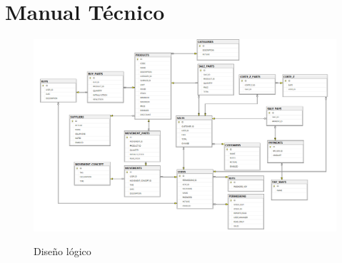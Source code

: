 \documentclass[a4paper,DIV=12]{scrreprt}
\begin{document}
 \section{Manual Técnico}
 \begin{figure}[!h]
     \includegraphics[width=16cm]{logico.png}\\
     \caption{Diseño lógico}
 \end{figure}
\end{document}
